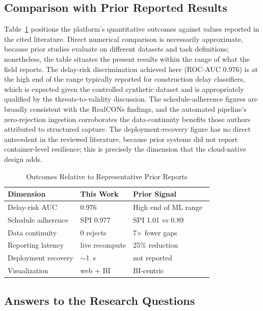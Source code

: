\documentclass[conference]{IEEEtran}
\begin{document}
\subsection{Comparison with Prior Reported Results}

Table~\ref{tab:benchmark} positions the platform's quantitative outcomes against values reported in the cited literature. Direct numerical comparison is necessarily approximate, because prior studies evaluate on different datasets and task definitions; nonetheless, the table situates the present results within the range of what the field reports. The delay-risk discrimination achieved here (ROC-AUC 0.976) is at the high end of the range typically reported for construction delay classifiers, which is expected given the controlled synthetic dataset and is appropriately qualified by the threats-to-validity discussion. The schedule-adherence figures are broadly consistent with the RealCONs findings, and the automated pipeline's zero-rejection ingestion corroborates the data-continuity benefits those authors attributed to structured capture. The deployment-recovery figure has no direct antecedent in the reviewed literature, because prior systems did not report container-level resilience; this is precisely the dimension that the cloud-native design adds.

\begin{table}[t]
\caption{Outcomes Relative to Representative Prior Reports}
\label{tab:benchmark}
\centering
\scriptsize
\setlength{\tabcolsep}{2.5pt}
\begin{tabular}{@{}p{2.4cm}p{1.7cm}p{2.2cm}@{}}
\toprule
\textbf{Dimension} & \textbf{This Work} & \textbf{Prior Signal} \\
\midrule
Delay-risk AUC & 0.976 & High end of ML range~\cite{sanusi2024role} \\
Schedule adherence & SPI 0.977 & SPI 1.01 vs 0.89~\cite{radman2026realcons} \\
Data continuity & 0 rejects & 7$\times$ fewer gaps~\cite{radman2026realcons} \\
Reporting latency & live recompute & 25\% reduction~\cite{gajera2023integrating} \\
Deployment recovery & $\sim$1~s & not reported \\
Visualization & web + BI & BI-centric~\cite{alsulaiti2021using} \\
\bottomrule
\end{tabular}
\end{table}

\subsection{Answers to the Research Questions}
\end{document}
